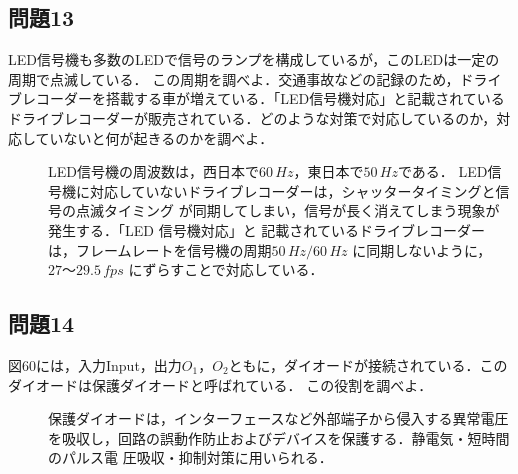 \subsection*{問題13}
LED信号機も多数のLEDで信号のランプを構成しているが，このLEDは一定の周期で点滅している．
この周期を調べよ．交通事故などの記録のため，ドライブレコーダーを搭載する車が増えている．「LED信号機対応」と記載されている
ドライブレコーダーが販売されている．どのような対策で対応しているのか，対応していないと何が起きるのかを調べよ．
\begin{description}
    \item[] LED信号機の周波数は，西日本で$60\,\si{Hz}$，東日本で$50\,\si{Hz}$である．
    LED信号機に対応していないドライブレコーダーは，シャッタータイミングと信号の点滅タイミング
    が同期してしまい，信号が長く消えてしまう現象が発生する．「LED 信号機対応」と
    記載されているドライブレコーダーは，フレームレートを信号機の周期$50\,\si{Hz}/60\,\si{Hz}$
    に同期しないように，$27～29.5\,\si{fps}$ にずらすことで対応している．
\end{description}

\subsection*{問題14}
図60には，入力Input，出力$O_1，O_2$ともに，ダイオードが接続されている．このダイオードは保護ダイオードと呼ばれている．
この役割を調べよ．
\begin{description}
    \item[] 保護ダイオードは，インターフェースなど外部端子から侵入する異常電圧
    を吸収し，回路の誤動作防止およびデバイスを保護する．静電気・短時間のパルス電
    圧吸収・抑制対策に用いられる．
\end{description}